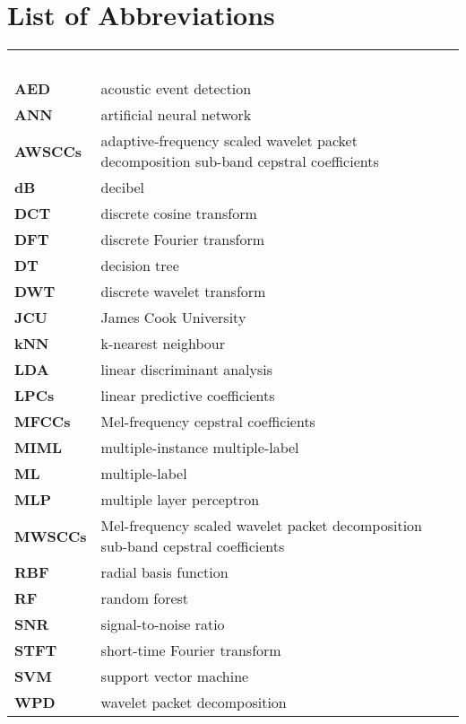 

\chapter*{List of Abbreviations}


\renewcommand{\arraystretch}{1.4} 
\begin{longtable}{llr}
\multicolumn{3}{l}{\textbf{}\hspace{0.4\textwidth}~~}\\
\textbf{AED}	   &                 acoustic event detection \\
\textbf{ANN}     &  artificial neural network  \\
\textbf{AWSCCs} & adaptive-frequency scaled wavelet packet decomposition sub-band cepstral coefficients \\
\textbf{dB}    &                      decibel \\
\textbf{DCT}    &                    discrete cosine transform \\
\textbf{DFT}   &                    discrete Fourier transform \\
\textbf{DT}     &                  decision tree                       \\
\textbf{DWT}   & discrete wavelet transform \\
\textbf{JCU} & James Cook University \\
\textbf{kNN}	  &                  k-nearest neighbour \\
\textbf{LDA}      &                  linear discriminant analysis \\
\textbf{LPCs}	 &                   linear predictive coefficients \\
\textbf{MFCCs} &	       Mel-frequency cepstral coefficients \\
\textbf{MIML}   &                 multiple-instance multiple-label  \\ 
\textbf{ML}    &                      multiple-label \\
\textbf{MLP}    &                   multiple layer perceptron \\
\textbf{MWSCCs} & Mel-frequency scaled wavelet packet decomposition sub-band cepstral coefficients \\
\textbf{RBF}    &                   radial basis function \\
\textbf{RF}     &                      random forest \\
\textbf{SNR}   &     signal-to-noise ratio\\
\textbf{STFT} & short-time Fourier transform \\
\textbf{SVM}	     &               support vector machine \\
\textbf{WPD}     &                 wavelet packet decomposition \\
\end{longtable}

